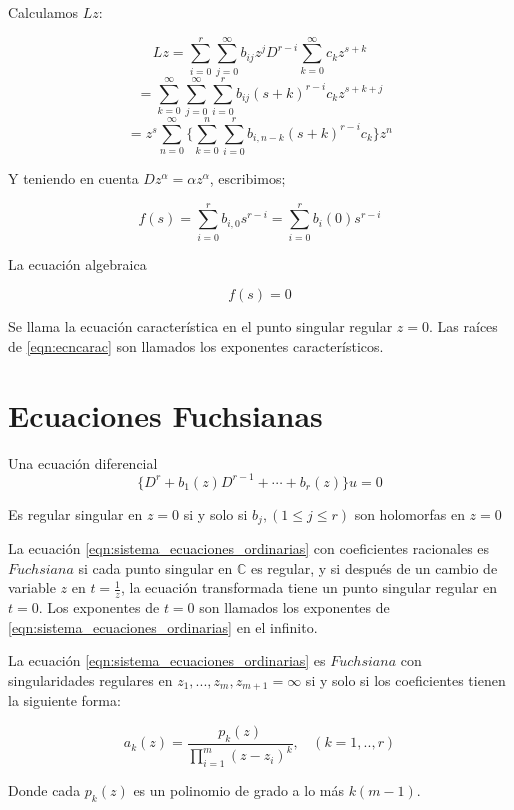 Calculamos $Lz$:

$$Lz = \sum_{i=0}^{r} \sum_{j=0}^{\infty} b_{ij} z^{j} D^{r-i} \sum_{k=0}^{\infty} c_{k} z ^{s+k}$$
$$= \sum_{k=0}^{\infty} \sum_{j=0}^{\infty} \sum_{i=0}^{r} b_{ij} (s+k)^{r-i}c_{k}z^{s+k+j}$$
$$= z^{s} \sum_{n=0}^{\infty} \lbrace \sum_{k=0}^{n} \sum_{i=0}^{r}  b_{i,n-k}(s+k)^{r-i}c_{k} \rbrace z^{n} $$

Y teniendo en cuenta $Dz^{\alpha} = \alpha z^{\alpha}$, escribimos;

$$f(s) = \sum_{i=0}^{r} b_{i,0}s^{r-i} = \sum_{i=0}^{r} b_{i}(0) s^{r-i}$$

\begin{defn} La ecuaci\'on algebraica

 \begin{equation} \label{eqn:ecncarac} f(s)=0 \end{equation}

Se llama la ecuaci\'on caracter\'istica en el punto singular regular $z=0$. Las ra\'ices de \ref{eqn:ecncarac}  son llamados los exponentes caracter\'isticos.
\end{defn}

\section{ Ecuaciones Fuchsianas }

\begin{lem} Una ecuaci\'on diferencial
$$ \lbrace D^{r} + b_{1}(z)D^{r-1} + \cdots + b_{r}(z)  \rbrace u =0$$

Es regular singular en $z=0$ si y solo si $b_{j}, (1 \leq j \leq r)$ son holomorfas en $z=0$
\end{lem}

La ecuaci\'on \ref{eqn:sistema_ecuaciones_ordinarias} con coeficientes racionales es $Fuchsiana$ si cada punto singular en ${\mathbb{C}}$ es regular, y si despu\'es de un cambio de variable $z$ en $t=\frac{1}{z}$, la ecuaci\'on transformada tiene un punto singular regular en $t=0$. Los exponentes de $t=0$ son llamados los exponentes de \ref{eqn:sistema_ecuaciones_ordinarias} en el infinito.

\begin{prop}
La ecuaci\'on \ref{eqn:sistema_ecuaciones_ordinarias} es $Fuchsiana$ con singularidades regulares en $z_{1},...,z_{m},z_{m+1} = \infty $ si y solo si los coeficientes tienen la siguiente forma:

$$ a_{k}(z) = \frac{p_{k}(z)}{\prod^{m}_{i=1}  (z-z_{i})^{k}}, \ \ \ \ (k=1,..,r)$$

Donde cada $p_{k}(z)$ es un polinomio de grado a lo m\'as $k(m-1)$.
\end{prop}

